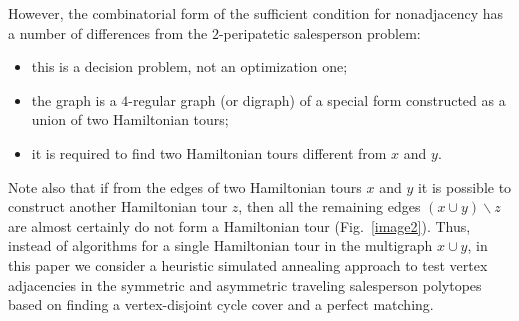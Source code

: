 \documentclass[runningheads]{llncs}
\begin{document}
However, the combinatorial form of the sufficient condition for nonadjacency has a number of differences from the $2$-peripatetic salesperson problem: %
\begin{itemize}
	\item this is a decision problem, not an optimization one; %
	\item the graph is a $4$-regular graph (or digraph) of a special form constructed as a union of two Hamiltonian tours; %
	\item it is required to find two Hamiltonian tours different from $x$ and $y$. %
\end{itemize}

Note also that if from the edges of two Hamiltonian tours $x$ and $y$ it is possible to construct another Hamiltonian tour $z$, then all the remaining edges $(x \cup y) \backslash z$ are almost certainly do not form a Hamiltonian tour (Fig.~\ref{image2}). Thus, instead of algorithms for a single Hamiltonian tour in the multigraph $x \cup y$, in this paper we consider a heuristic simulated annealing approach to test vertex adjacencies in the symmetric and asymmetric traveling salesperson polytopes based on finding a vertex-disjoint cycle cover and a perfect matching. %
\end{document}
